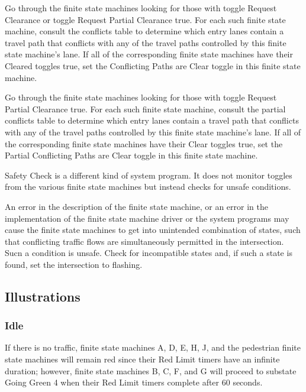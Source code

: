 \documentclass[letterpaper,twoside]{article}
\begin{document}
\begin{description}
  Go through the finite state machines looking for those with toggle
  Request Clearance or toggle Request Partial Clearance
  true.  For each such finite state machine, consult the conflicts table
  to determine which entry lanes contain a travel path that conflicts
  with any of the travel paths controlled by this finite state machine's
  lane.  If all of the corresponding finite state machines have their
  Cleared toggles true, set the Conflicting Paths are Clear toggle
  in this finite state machine.

\item[Partial Conflicting Paths are Clear]

  Go through the finite state machines looking for those with toggle
  Request Partial Clearance true.
  For each such finite state machine, consult the partial
  conflicts table to determine which entry lanes contain a travel path
  that conflicts with any of the travel paths controlled by this finite state
  machine's lane.  If all of the corresponding finite state machines
  have their Clear toggles true, set the Partial Conflicting Paths are Clear
  toggle in this finite state machine.

\item[Safety Check]

  Safety Check is a different kind of system program.  It does not
  monitor toggles from the various finite state machines but instead checks
  for unsafe conditions.  
  
  An error in the description of the finite state machine, or an error
  in the implementation of the finite state machine driver or the
  system programs may cause the finite state machines to get into unintended
  combination of states, such that conflicting traffic flows are simultaneously
  permitted in the
  intersection.  Sucn a condition is unsafe.  Check for incompatible
  states and, if such a state is found, set the intersection to flashing.

\end{description}

\subsection{Illustrations}

\subsubsection{Idle}

If there is no traffic, finite state machines A, D, E, H, J, and the
pedestrian finite state machines will remain red
since their Red Limit timers have an infinite duration; however,
finite state machines B, C, F, and G will proceed to substate
Going Green 4 when their Red Limit timers complete after 60 seconds.
\end{document}
